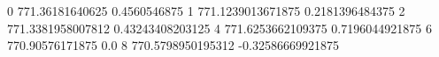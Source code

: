 0 771.36181640625 0.4560546875
1 771.1239013671875 0.2181396484375
2 771.3381958007812 0.43243408203125
4 771.6253662109375 0.7196044921875
6 770.90576171875 0.0
8 770.5798950195312 -0.32586669921875

